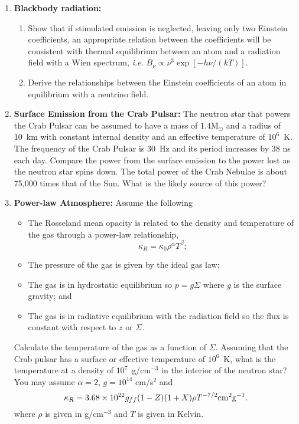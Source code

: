 \begin{enumerate}
\item {\bf Blackbody radiation:}
\begin{enumerate}
\item Show that if stimulated emission is neglected, leaving only two
  Einstein coefficients, an appropriate relation between the
  coefficients will be consistent with thermal equilibrium between an
  atom and a radiation field with a Wien spectrum, {\em i.e.} $B_\nu
  \propto \nu^3 \exp[-h\nu/(kT)]$.
\item Derive the relationships between the Einstein coefficients of an
  atom in equilibrium with a neutrino field.  
\end{enumerate}
\item {\bf Surface Emission from the Crab Pulsar:}  The neutron star
  that powers the Crab Pulsar can be assumed to have a mass of
  $1.4\mathrm{M}_\odot$ and a radius of 10~km with constant internal
  density and an effective temperature of $10^6$~K.  The frequency of
  the Crab Pulsar is 30~Hz and its period increases by 38 ns each
  day.  Compare the power from the surface emission to the power
  lost as the neutron star spins down.  The total power of the Crab
  Nebulae is about 75,000 times that of the Sun.  What is the likely
  source of this power?
\item {\bf Power-law Atmosphere:}  Assume the following
\begin{itemize}
\item The Rosseland mean
  opacity is related to the density and temperature of the gas through
  a power-law relationship,
$$
\kappa_R = \kappa_0 \rho^{\alpha} T^{\beta};
$$
\item The pressure of the gas is given by the ideal gas law;
\item The gas is in hydrostatic equilibrium so $p=g\Sigma$ where
$g$ is the surface gravity; and
\item The gas is in radiative equilibrium with the radiation field so 
the flux is constant with respect to $z$ or $\Sigma$.
\end{itemize}
Calculate the temperature of the gas as a function of $\Sigma$.
Assuming that the Crab pulsar has a surface or effective temperature
of $10^6$~K, what is the temperature at a density of
$10^7$~g/cm$^{-3}$ in the interior of the neutron star?  You may
assume $\alpha=2$, $g=10^{14}$ cm/s$^2$ and
$$
\kappa_R = 3.68 \times 10^{22} g_{ff}(1 - Z)(1 + X) \rho T^{-7/2} {\rm cm^2 g^{-1}}.
$$
where $\rho$ is given in g/cm$^{-3}$ and $T$ is given in Kelvin.


\end{enumerate}
